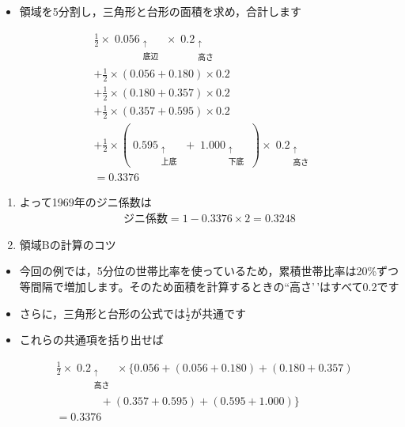 \documentclass[
]{book}
\providecommand{\tightlist}{%
  \setlength{\itemsep}{0pt}\setlength{\parskip}{0pt}}
\theoremstyle{definition}
\theoremstyle{definition}
\theoremstyle{definition}
\theoremstyle{definition}
\theoremstyle{remark}
\begin{document}
\begin{itemize}
\tightlist
\item
  領域を5分割し，三角形と台形の面積を求め，合計します
\end{itemize}

\begin{align*} 
&\tfrac{1}{2} \times \mathop{0.056}_{\substack{\uparrow \\ \text{底辺}}} \times \mathop{0.2}_{\substack{\uparrow \\ \text{高さ}}} \\
&+\tfrac{1}{2} \times (0.056+0.180) \times 0.2 \\
&+\tfrac{1}{2} \times (0.180+0.357) \times 0.2 \\
&+\tfrac{1}{2} \times (0.357+0.595) \times 0.2 \\
&+\tfrac{1}{2} \times (
\mathop{0.595}_{\substack{\uparrow \\ \text{上底}}}
+
\mathop{1.000}_{\substack{\uparrow \\ \text{下底}}}
) \times 
\mathop{0.2}_{\substack{\uparrow \\ \text{高さ}}} \\
&=0.3376
\end{align*}

\begin{enumerate}
\def\labelenumi{\arabic{enumi}.}
\setcounter{enumi}{3}
\item
  よって1969年のジニ係数は
  \begin{align*}
  \text{ジニ係数}=1-0.3376\times 2=0.3248
  \end{align*}
\item
  領域Bの計算のコツ
\end{enumerate}

\begin{itemize}
\item
  今回の例では，5分位の世帯比率を使っているため，累積世帯比率は20\%ずつ等間隔で増加します。そのため面積を計算するときの``高さ'\,'はすべて0.2です
\item
  さらに，三角形と台形の公式では\(\tfrac{1}{2}\)が共通です
\item
  これらの共通項を括り出せば
\end{itemize}

\begin{align*} 
&\tfrac{1}{2} \times \mathop{0.2}_{\substack{\uparrow \\ \text{高さ}}} \times 
\{ 0.056+ (0.056+0.180)+ (0.180+0.357) \\
&\qquad\qquad+(0.357+0.595)+(0.595+1.000) \} \\
&=0.3376
\end{align*}
\end{document}

